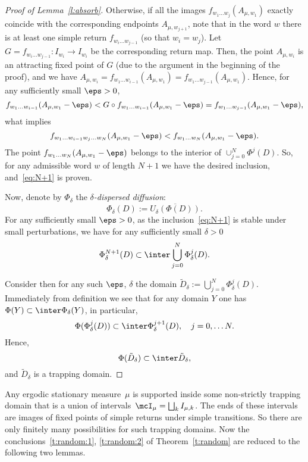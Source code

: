 \documentclass[a4paper,12pt]{amsart}
\begin{document}
\begin{proof}[Proof of Lemma~\ref{l:absorb}]
Otherwise, if all the images $f_{w_1\dots w_j}(A_{\mu,w_1})$ exactly coincide with the corresponding endpoints $A_{\mu,w_{j+1}}$, note that in the word $w$ there is at least one simple return $f_{w_i\dots w_{j-1}}$ (so that $w_i=w_j$). Let $G=f_{w_i\dots w_{j-1}}:I_{w_i}\to I_{w_i}$ be the corresponding return map. Then, the point $A_{\mu,w_i}$ is an attracting fixed point of $G$ (due to the argument in the beginning of the proof), and we have $A_{\mu,w_i}=f_{w_1\dots w_{i-1}}(A_{\mu,w_1})=f_{w_1\dots w_{j-1}}(A_{\mu,w_1})$. Hence, for any sufficiently small $\eps>0$,
$$
f_{w_1\dots w_{i-1}}(A_{\mu,w_1}-\eps)< G\circ f_{w_1\dots w_{i-1}}(A_{\mu,w_1}-\eps)  = f_{w_1\dots w_{j-1}}(A_{\mu,w_1}-\eps),
$$
what implies
$$
f_{w_1\dots w_{i-1}w_j\dots w_N}(A_{\mu,w_1}-\eps)<f_{w_1\dots w_{N}}(A_{\mu,w_1}-\eps).
$$
The point $f_{w_1\dots w_{N}}(A_{\mu,w_1}-\eps)$ belongs to the interior of $\cup_{j=0}^N \Phi^j(D)$.
So, for any admissible word $w$ of length $N+1$ we have the desired inclusion, and~\eqref{eq:N+1} is proven.


Now, denote by $\Phi_{\delta}$ the \emph{$\delta$-dispersed diffusion}:
$$
\Phi_\delta (D) := \overline{U_\delta (\Phi(D))}.
$$
For any sufficiently small $\eps>0$, as the inclusion~\eqref{eq:N+1} is stable under small perturbations, we have for any sufficiently small $\delta>0$
\begin{equation}\label{eq:delta}
\Phi_{\delta}^{N+1}(D) \subset 
\inter \bigcup_{j=0}^N \Phi_{\delta}^j(D).
\end{equation}

Consider then for any such $\eps$, $\delta$ the domain $\tilde{D}_{\delta}:=\bigcup_{j=0}^{N} \Phi_\delta^j (D)$. Immediately from definition we see that for any domain $Y$ one has $\Phi(Y)\subset \inter \Phi_{\delta}(Y)$, in particular,
$$
\Phi(\Phi_{\delta}^{j}(D))\subset \inter \Phi_{\delta}^{j+1}(D), \quad j=0,\dots N.
$$
Hence,
$$
\Phi(\tilde{D}_{\delta}) \subset \inter \tilde{D}_\delta,
$$
and $\tilde{D}_\delta$ is a trapping domain.
\end{proof}

Any ergodic stationary measure~$\mu$ is supported inside some non-strictly trapping domain that is a union of intervals~$\mcI_\mu = \bigsqcup_k I_{\mu,k}$. The ends of these intervals are images of fixed points of simple returns under simple transitions. So there are only finitely many possibilities for such trapping domains.
Now the conclusions~\ref{t:random:1}, \ref{t:random:2} of Theorem~\ref{t:random} are reduced to the following two lemmas.
\end{document}
